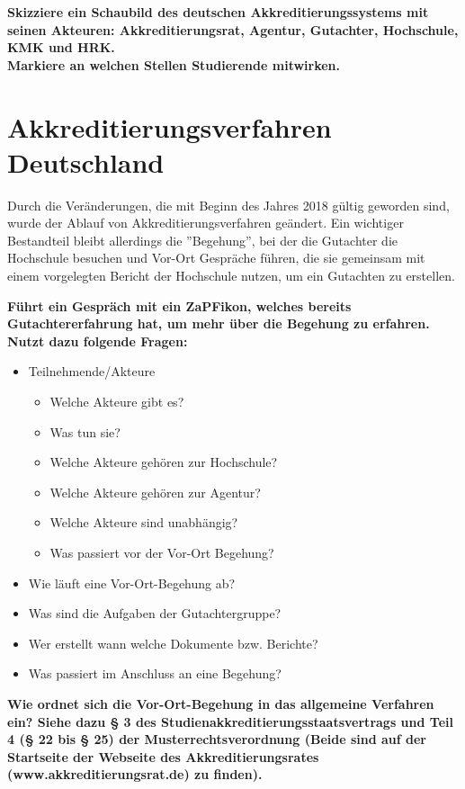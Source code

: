 \documentclass{scrartcl}
\begin{document}
\vspace{1cm}

\textbf{Skizziere ein Schaubild des deutschen Akkreditierungssystems mit seinen Akteuren: Akkreditierungsrat, Agentur, Gutachter, Hochschule, KMK und HRK. \\
Markiere an welchen Stellen Studierende mitwirken.}

\newpage
\section*{Akkreditierungsverfahren Deutschland}
Durch die Veränderungen, die mit Beginn des Jahres 2018 gültig geworden sind, wurde der Ablauf von Akkreditierungsverfahren geändert. Ein wichtiger Bestandteil bleibt allerdings die ''Begehung'', bei der die Gutachter die Hochschule besuchen und Vor-Ort Gespräche führen, die sie gemeinsam mit einem vorgelegten Bericht der Hochschule nutzen, um ein Gutachten zu erstellen.

\vspace{0.5cm}

\textbf{Führt ein Gespräch mit ein ZaPFikon, welches bereits Gutachtererfahrung hat, um mehr über die Begehung zu erfahren. Nutzt dazu folgende Fragen: }

\begin{itemize}
\item Teilnehmende/Akteure
	\begin{itemize}
		\item Welche Akteure gibt es?
		\item Was tun sie?
		\item Welche Akteure gehören zur Hochschule?
		\item Welche Akteure gehören zur Agentur?
		\item Welche Akteure sind unabhängig?
		\item Was passiert vor der Vor-Ort Begehung?
	\end{itemize}
\item Wie läuft eine Vor-Ort-Begehung ab?
\item Was sind die Aufgaben der Gutachtergruppe?
\item Wer erstellt wann welche Dokumente bzw. Berichte?
\item Was passiert im Anschluss an eine Begehung?
\end{itemize}

\textbf{Wie ordnet sich die Vor-Ort-Begehung in das allgemeine Verfahren ein? Siehe dazu § 3 des Studienakkreditierungsstaatsvertrags und Teil 4 (§ 22 bis § 25) der Musterrechtsverordnung (Beide sind auf der Startseite der Webseite des Akkreditierungsrates (www.akkreditierungsrat.de) zu finden).}
\end{document}
